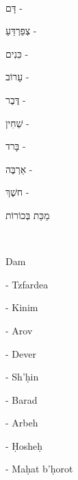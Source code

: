 \documentclass[letter,11pt,openany]{memoir}
\newenvironment{HgTranslit}{\strut\\
\noindent
\begin{itshape}
	}{
\end{itshape}
\vspace{1em}}
\newenvironment{HgHebrew}{
\begin{hebrew}
	\strut\\
	\noindent\LARGE}{
\end{hebrew}
}
\begin{document}
\begin{HgHebrew}
	
	דָּם -
	
	צְפֵרְדֵּעַ -
	
	כִּנִים -
	
	עָרוֹב -
	
	דֶּבֶר -
	
	שְׁחִין -
	
	בָּרד -
	
	אַרְבֶּה -
	
	חשֶׁךְ -
	
	מַכַּת בְּכוֹרוֹת 
	
\end{HgHebrew}
\vspace{-1.2em}

\noindent

\begin{HgTranslit}
	\small
	
	Dam 
	
	- Tzfardea 
	
	- Kinim 
	
	- Arov 
	
	- Dever 
	
	- Sh'\d{h}in 
	
	- Barad 
	
	- Arbeh 
	
	- \d{H}oshe\d{h} 
	
	- Ma\d{h}at b'\d{h}orot
	
\end{HgTranslit}
\end{document}
